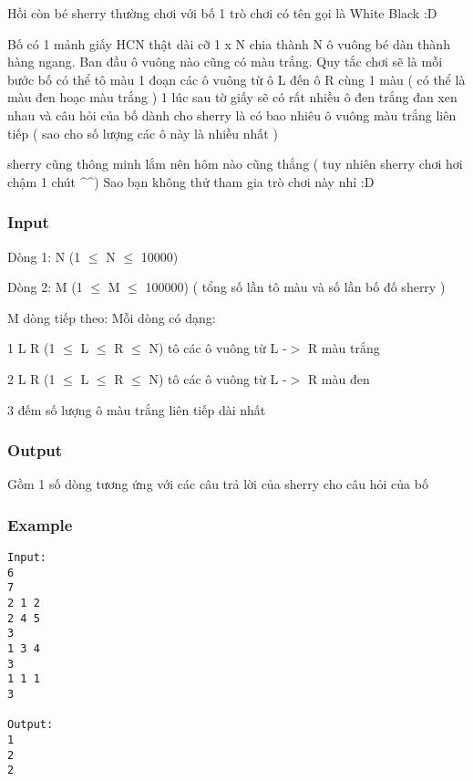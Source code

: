 



   Hồi còn bé sherry thường chơi với bố 1 trò chơi có tên gọi là White Black :D  

   Bố có 1 mảnh giấy HCN thật dài cỡ 1 x N chia thành N ô vuông bé dàn thành hàng ngang. Ban đầu ô vuông nào cũng có màu trắng. Quy tắc chơi sẽ là mỗi bước bố có thể tô màu 1 đoạn các ô vuông từ ô L đến ô R cùng 1 màu ( có thể là màu đen hoạc màu trắng ) 1 lúc sau tờ giấy sẽ có rất nhiều ô đen trắng đan xen nhau và câu hỏi của bố dành cho sherry là có bao nhiêu ô vuông màu trắng liên tiếp ( sao cho số lượng các ô này là nhiều nhất )  

   sherry cũng thông minh lắm nên hôm nào cũng thắng ( tuy nhiên sherry chơi hơi chậm 1 chút \textasciicircum\textasciicircum ) Sao bạn không thử tham gia trò chơi này nhỉ :D  

\subsubsection{   Input  }

   Dòng 1: N (1  $\le$  N  $\le$  10000)  

   Dòng 2: M (1  $\le$  M  $\le$  100000) ( tổng số lần tô màu và số lần bố đố sherry )  

   M dòng tiếp theo: Mỗi dòng có dạng:  

   1  L  R  (1  $\le$  L  $\le$  R  $\le$  N) tô các ô vuông từ L -$>$ R màu trắng  

   2  L  R  (1  $\le$  L  $\le$  R  $\le$  N) tô các ô vuông từ L -$>$ R màu đen  

   3 đếm số lượng ô màu trắng liên tiếp dài nhất  

\subsubsection{   Output  }

   Gồm 1 số dòng tương ứng với các câu trả lời của sherry cho câu hỏi của bố  

\subsubsection{   Example  }
\begin{verbatim}
Input:
6
7
2 1 2
2 4 5
3
1 3 4
3
1 1 1
3

Output:
1
2
2
\end{verbatim}
